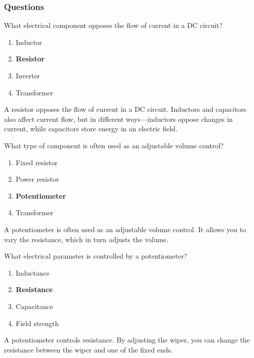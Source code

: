 \subsubsection*{Questions}

\begin{tcolorbox}[colback=gray!10!white,colframe=black!75!black,title={T6A01}]
    What electrical component opposes the flow of current in a DC circuit?
    \begin{enumerate}[label=\Alph*),noitemsep]
        \item Inductor
        \item \textbf{Resistor}
        \item Inverter
        \item Transformer
    \end{enumerate}
\end{tcolorbox}
A resistor opposes the flow of current in a DC circuit. Inductors and capacitors also affect current flow, but in different ways—inductors oppose changes in current, while capacitors store energy in an electric field.

\begin{tcolorbox}[colback=gray!10!white,colframe=black!75!black,title={T6A02}]
    What type of component is often used as an adjustable volume control?
    \begin{enumerate}[label=\Alph*),noitemsep]
        \item Fixed resistor
        \item Power resistor
        \item \textbf{Potentiometer}
        \item Transformer
    \end{enumerate}
\end{tcolorbox}
A potentiometer is often used as an adjustable volume control. It allows you to vary the resistance, which in turn adjusts the volume.

\begin{tcolorbox}[colback=gray!10!white,colframe=black!75!black,title={T6A03}]
    What electrical parameter is controlled by a potentiometer?
    \begin{enumerate}[label=\Alph*),noitemsep]
        \item Inductance
        \item \textbf{Resistance}
        \item Capacitance
        \item Field strength
    \end{enumerate}
\end{tcolorbox}
A potentiometer controls resistance. By adjusting the wiper, you can change the resistance between the wiper and one of the fixed ends.

